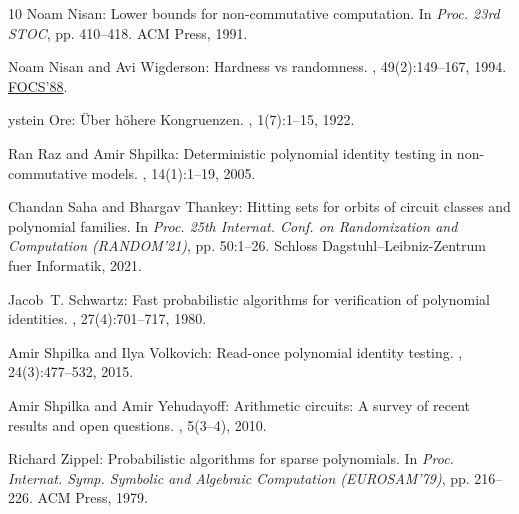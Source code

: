 \begin{thebibliography}{10}
{\sc Noam Nisan}: Lower bounds for non-commutative computation.
\newblock In {\em Proc. 23rd STOC}, pp. 410--418. ACM Press, 1991.
\newblock [\epfmtdoi{10.1145/103418.103462}]

{\sc Noam Nisan and Avi Wigderson}: Hardness vs randomness.
, 49(2):149--167, 1994.
\newblock \prelim \href{https://doi.org/10.1109/SFCS.1988.21916}{FOCS'88}.
\newblock [\epfmtdoi{10.1016/S0022-0000(05)80043-1}]

{\sc {\O}ystein Ore}: {\"U}ber {h}\"ohere {K}ongruenzen.
, 1(7):1--15, 1922.

{\sc Ran Raz and Amir Shpilka}: Deterministic polynomial identity testing in
  non-commut\-ative models.
, 14(1):1--19, 2005.
\newblock [\epfmtdoi{10.1007/s00037-005-0188-8}]

{\sc Chandan Saha and Bhargav Thankey}: Hitting sets for orbits of circuit
  classes and polynomial families.
\newblock In {\em Proc. 25th Internat. Conf. on Randomization and Computation
  (RANDOM'21)}, pp. 50:1--26. Schloss Dagstuhl--Leibniz-Zentrum fuer
  Informatik, 2021.

{\sc Jacob~T. Schwartz}: Fast probabilistic algorithms for verification of
  polynomial identities.
, 27(4):701--717, 1980.
\newblock [\epfmtdoi{10.1145/322217.322225}]

{\sc Amir Shpilka and Ilya Volkovich}: Read-once polynomial identity testing.
, 24(3):477--532, 2015.
\newblock [\epfmtdoi{10.1007/s00037-015-0105-8}]

{\sc Amir Shpilka and Amir Yehudayoff}: Arithmetic circuits: A survey of recent
  results and open questions.
, 5(3--4), 2010.
\newblock [\epfmtdoi{10.1561/0400000039}]

{\sc Richard Zippel}: Probabilistic algorithms for sparse polynomials.
\newblock In {\em Proc. Internat. Symp. Symbolic and Algebraic Computation
  (EUROSAM'79)}, pp. 216--226. ACM Press, 1979.
\newblock [\epfmtdoi{10.1007/3-540-09519-5\_73}]

\end{thebibliography}